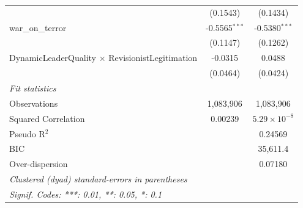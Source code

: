 \begin{tabular}{lcc}
                                                          & (0.1543)             & (0.1434)\\   
   war\_on\_terror                                        & -0.5565$^{***}$      & -0.5380$^{***}$\\   
                                                          & (0.1147)             & (0.1262)\\   
   DynamicLeaderQuality $\times$ RevisionistLegitimation  & -0.0315              & 0.0488\\   
                                                          & (0.0464)             & (0.0424)\\   
   \midrule
   \emph{Fit statistics}\\
   Observations                                           & 1,083,906            & 1,083,906\\  
   Squared Correlation                                    & 0.00239              & $5.29\times 10^{-8}$\\   
   Pseudo R$^2$                                           &                      & 0.24569\\  
   BIC                                                    &                      & 35,611.4\\  
   Over-dispersion                                        &                      & 0.07180\\  
   \midrule \midrule
   \multicolumn{3}{l}{\emph{Clustered (dyad) standard-errors in parentheses}}\\
   \multicolumn{3}{l}{\emph{Signif. Codes: ***: 0.01, **: 0.05, *: 0.1}}\\
\end{tabular}
\par\endgroup



